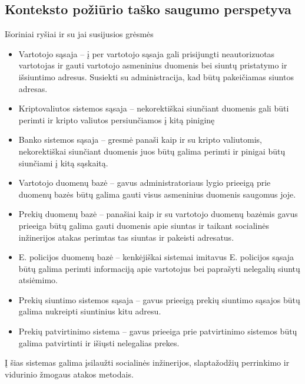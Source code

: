\documentclass{VUMIFPSmagistrinis}
\begin{document}
			\subsection{Konteksto požiūrio taško saugumo perspetyva}
				Išoriniai ryšiai ir su jai susijusios grėsmės
				\begin{itemize}
					\item{Vartotojo sąsaja -- į per vartotojo sąsaja gali prisijungti neautorizuotas vartotojas ir gauti vartotojo asmeninius duomenis bei siuntų pristatymo ir išsiuntimo adresus. Susiekti su administracija, kad būtų pakeičiamas siuntos adresas. }
					\item{Kriptovaliutos sistemos sąsaja -- nekorektiškai siunčiant duomenis gali būti perimti ir kripto valiutos persiunčiamos į kitą piniginę}
					\item{Banko sistemos sąsaja -- gresmė panaši kaip ir su kripto valiutomis, nekorektiškai siunčiant duomenis juos būtų galima perimti ir pinigai būtų siunčiami į kitą sąskaitą.}
					\item{Vartotojo duomenų bazė -- gavus administratoriaus lygio prieeigą prie duomenų bazės būtų galima gauti visus asmeninius duomenis saugomus joje.}
					\item{Prekių duomenų bazė -- panašiai kaip ir su vartotojo duomenų bazėmis gavus prieeiga būtų galima gauti duomenis apie siuntas ir taikant socialinės inžinerijos atakas perimtas tas siuntas ir pakeisti adresatus.}
					\item{E. policijos duomenų bazė -- kenkėjiškai sistemai imitavus E. policijos sąsaja būtų galima perimti informaciją apie vartotojus bei paprašyti nelegalių siuntų atsiėmimo.}
					\item{Prekių siuntimo sistemos sąsaja -- gavus prieeigą prekių siuntimo sąsajos būtų galima nukreipti siuntinius kitu adresu.}
					\item{Prekių patvirtinimo sistema -- gavus prieeiga prie patvirtinimo sistemos būtų galima patvirtinti ir išiųsti nelegalias prekes.}
				\end{itemize}
				Į šias sistemas galima įsilaužti socialinės inžinerijos, slaptažodžių perrinkimo ir vidurinio žmogaus atakos metodais.
\end{document}
